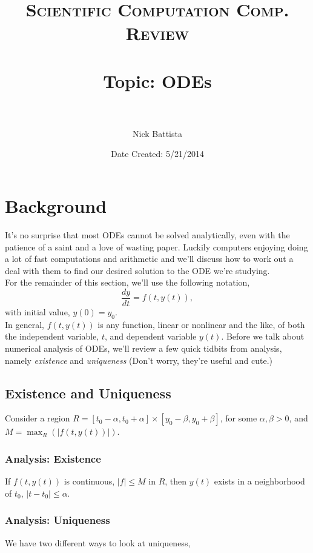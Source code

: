 \documentclass[paper=a4, fontsize=11pt]{scrartcl} %
\title{	
\normalfont \normalsize 
\textsc{Scientific Computation Comp. Review} \\ [25pt] %
\horrule{1pt} \\[0.05cm] %
\huge Topic: ODEs \\ %
\horrule{1pt} \\[0.05cm] %
}
\author{Nick Battista} %
\date{\normalsize Date Created: 5/21/2014} %
\numberwithin{equation}{section} %
\numberwithin{figure}{section} %
\numberwithin{table}{section} %
\begin{document}
\maketitle %


\section{Background}

It's no surprise that most ODEs cannot be solved analytically, even with the patience of a saint and a love of wasting paper. Luckily computers enjoying doing a lot of fast computations and arithmetic and we'll discuss how to work out a deal with them to find our desired solution to the ODE we're studying.\\

For the remainder of this section, we'll use the following notation, $$\frac{dy}{dt} = f(t, y(t) ),$$ with initial value, $y(0) = y_0$. \\

In general, $f(t,y(t))$ is any function, linear or nonlinear and the like, of both the independent variable, $t$, and dependent variable $y(t)$. Before we talk about numerical analysis of ODEs, we'll review a few quick tidbits from analysis, namely \emph{existence} and \emph{uniqueness} (Don't worry, they're useful and cute.)

\subsection{Existence and Uniqueness}

Consider a region $R = [t_0-\alpha,t_0+\alpha]\times[y_0-\beta,y_0+\beta]$, for some $\alpha,\beta >0$, and $M=\max_R( |f(t,y(t))| )$. 

\subsubsection{Analysis: Existence} If $f(t,y(t))$ is continuous, $|f|\leq M$ in $R$, then $y(t)$ exists in a neighborhood of $t_0$, $|t-t_0|\leq \alpha$.

\subsubsection{Analysis: Uniqueness} We have two different ways to look at uniqueness,
\end{document}
